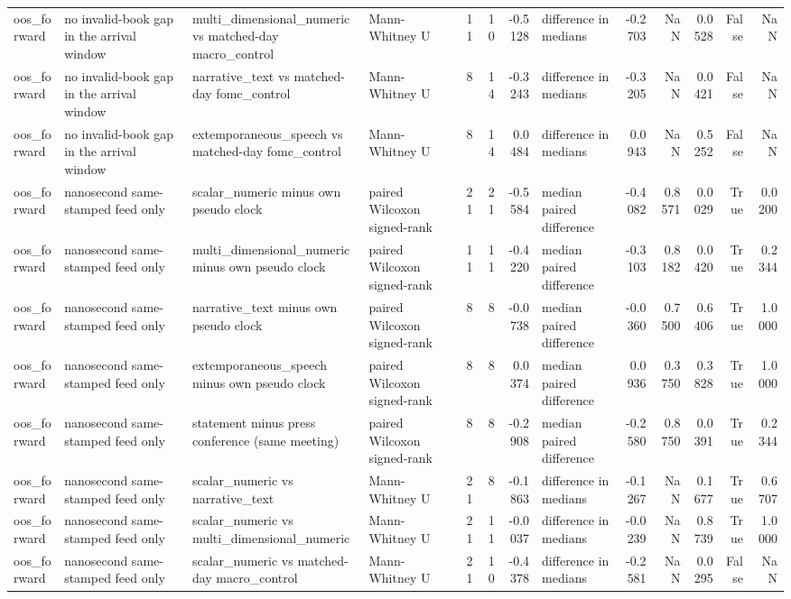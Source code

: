 \begin{tabular}{llllrrrlrrrrr}
oos_forward & no invalid-book gap in the arrival window & multi_dimensional_numeric vs matched-day macro_control & Mann-Whitney U & 11 & 10 & -0.5128 & difference in medians & -0.2703 & NaN & 0.0528 & False & NaN \\
oos_forward & no invalid-book gap in the arrival window & narrative_text vs matched-day fomc_control & Mann-Whitney U & 8 & 14 & -0.3243 & difference in medians & -0.3205 & NaN & 0.0421 & False & NaN \\
oos_forward & no invalid-book gap in the arrival window & extemporaneous_speech vs matched-day fomc_control & Mann-Whitney U & 8 & 14 & 0.0484 & difference in medians & 0.0943 & NaN & 0.5252 & False & NaN \\
oos_forward & nanosecond same-stamped feed only & scalar_numeric minus own pseudo clock & paired Wilcoxon signed-rank & 21 & 21 & -0.5584 & median paired difference & -0.4082 & 0.8571 & 0.0029 & True & 0.0200 \\
oos_forward & nanosecond same-stamped feed only & multi_dimensional_numeric minus own pseudo clock & paired Wilcoxon signed-rank & 11 & 11 & -0.4220 & median paired difference & -0.3103 & 0.8182 & 0.0420 & True & 0.2344 \\
oos_forward & nanosecond same-stamped feed only & narrative_text minus own pseudo clock & paired Wilcoxon signed-rank & 8 & 8 & -0.0738 & median paired difference & -0.0360 & 0.7500 & 0.6406 & True & 1.0000 \\
oos_forward & nanosecond same-stamped feed only & extemporaneous_speech minus own pseudo clock & paired Wilcoxon signed-rank & 8 & 8 & 0.0374 & median paired difference & 0.0936 & 0.3750 & 0.3828 & True & 1.0000 \\
oos_forward & nanosecond same-stamped feed only & statement minus press conference (same meeting) & paired Wilcoxon signed-rank & 8 & 8 & -0.2908 & median paired difference & -0.2580 & 0.8750 & 0.0391 & True & 0.2344 \\
oos_forward & nanosecond same-stamped feed only & scalar_numeric vs narrative_text & Mann-Whitney U & 21 & 8 & -0.1863 & difference in medians & -0.1267 & NaN & 0.1677 & True & 0.6707 \\
oos_forward & nanosecond same-stamped feed only & scalar_numeric vs multi_dimensional_numeric & Mann-Whitney U & 21 & 11 & -0.0037 & difference in medians & -0.0239 & NaN & 0.8739 & True & 1.0000 \\
oos_forward & nanosecond same-stamped feed only & scalar_numeric vs matched-day macro_control & Mann-Whitney U & 21 & 10 & -0.4378 & difference in medians & -0.2581 & NaN & 0.0295 & False & NaN \\

\end{tabular}
